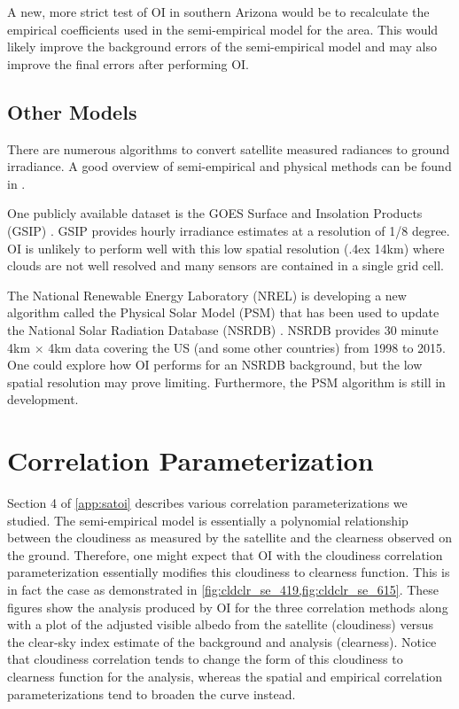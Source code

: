 A new, more strict test of OI in southern Arizona would be to
recalculate the empirical coefficients used in the semi-empirical
model for the area.
This would likely improve the background errors of the semi-empirical
model and may also improve the final errors after performing OI.

\subsection{Other Models}
There are numerous algorithms to convert satellite measured radiances
to ground irradiance.
A good overview of semi-empirical and physical methods can be found in
\cite{Perez2013a,Miller2013}.

One publicly available dataset is the GOES Surface and Insolation
Products (GSIP) \citep{Sengupta2010}.
GSIP provides hourly irradiance estimates at a resolution of 1/8
degree.
OI is unlikely to perform well with this low spatial resolution
({\raise.4ex \hbox{\texttildelow}}14km) where clouds are not well
resolved and many sensors are contained in a single grid cell.

The National Renewable Energy Laboratory (NREL) is developing a new
algorithm called the Physical Solar Model (PSM) that has been used to update
the National Solar Radiation Database (NSRDB) \citep{Sengupta2014}.
NSRDB provides 30 minute 4km $\times$ 4km data covering the US (and
some other countries) from 1998 to 2015.
One could explore how OI performs for an NSRDB background, but the low
spatial resolution may prove limiting.
Furthermore, the PSM algorithm is still in development.

\section{Correlation Parameterization}
\label{sec:corr_param}

Section 4 of \cref{app:satoi} describes various correlation
parameterizations we studied.
The semi-empirical model is essentially a polynomial relationship
between the cloudiness as measured by the satellite and the clearness
observed on the ground.
Therefore, one might expect that OI with the cloudiness correlation
parameterization essentially modifies this cloudiness to clearness
function.
This is in fact the case as demonstrated in
\cref{fig:cldclr_se_419,fig:cldclr_se_615}.
These figures show the analysis produced by OI for the three
correlation methods along with a plot of the adjusted visible albedo
from the satellite (cloudiness) versus the clear-sky index estimate of the
background and analysis (clearness).
Notice that cloudiness correlation tends to change the form of this
cloudiness to clearness function for the analysis, whereas the spatial
and empirical correlation parameterizations tend to broaden the curve
instead.

